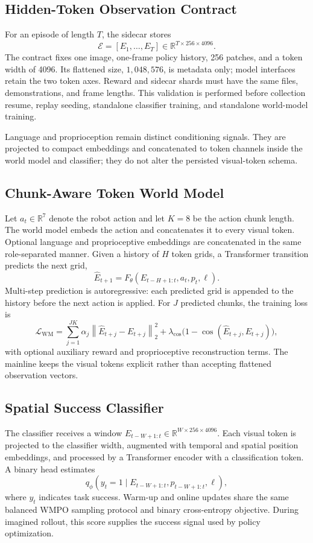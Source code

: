\subsection{Hidden-Token Observation Contract}

For an episode of length $T$, the sidecar stores
\[
\mathcal{E}=[E_1,\ldots,E_T]
    \in \mathbb{R}^{T\times256\times4096}.
\]
The contract fixes one image, one-frame policy history, 256 patches, and a token
width of 4096.  Its flattened size, $1{,}048{,}576$, is metadata only; model
interfaces retain the two token axes.  Reward and sidecar shards must have the
same files, demonstrations, and frame lengths.  This validation is performed
before collection resume, replay seeding, standalone classifier training, and
standalone world-model training.

Language and proprioception remain distinct conditioning signals.  They are
projected to compact embeddings and concatenated to token channels inside the
world model and classifier; they do not alter the persisted visual-token
schema.

\subsection{Chunk-Aware Token World Model}

Let $a_t\in\mathbb{R}^{7}$ denote the robot action and let $K=8$ be the action
chunk length.  The world model embeds the action and concatenates it to every
visual token.  Optional language and proprioceptive embeddings are concatenated
in the same role-separated manner.  Given a history of $H$ token grids, a
Transformer transition predicts the next grid,
\[
\widehat{E}_{t+1}
  = F_\theta(E_{t-H+1:t},a_t,p_t,\ell).
\]
Multi-step prediction is autoregressive: each predicted grid is appended to
the history before the next action is applied.  For $J$ predicted chunks, the
training loss is
\[
\mathcal{L}_{\mathrm{WM}}
 = \sum_{j=1}^{JK} \alpha_j
   \left\|\widehat{E}_{t+j}-E_{t+j}\right\|_2^2
   + \lambda_{\cos}
   \bigl(1-\cos(\widehat{E}_{t+j},E_{t+j})\bigr),
\]
with optional auxiliary reward and proprioceptive reconstruction terms.  The
mainline keeps the visual tokens explicit rather than accepting flattened
observation vectors.

\subsection{Spatial Success Classifier}

The classifier receives a window
$E_{t-W+1:t}\in\mathbb{R}^{W\times256\times4096}$.
Each visual token is projected to the classifier width, augmented with temporal
and spatial position embeddings, and processed by a Transformer encoder with a
classification token.  A binary head estimates
\[
q_\phi(y_t=1\mid E_{t-W+1:t},p_{t-W+1:t},\ell),
\]
where $y_t$ indicates task success.  Warm-up and online updates share the same
balanced WMPO sampling protocol and binary cross-entropy objective.  During
imagined rollout, this score supplies the success signal used by policy
optimization.


